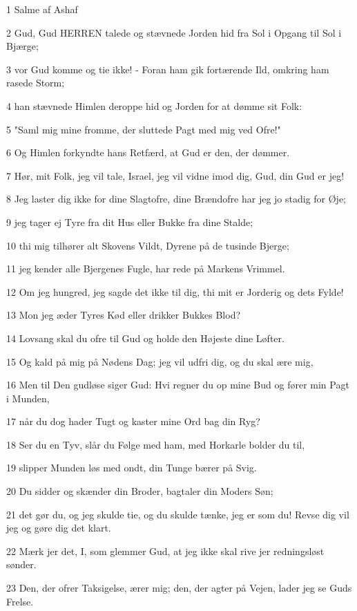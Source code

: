\par 1 Salme af Ashaf
\par 2 Gud, Gud HERREN talede og stævnede Jorden hid fra Sol i Opgang til Sol i Bjærge;
\par 3 vor Gud komme og tie ikke! - Foran ham gik fortærende Ild, omkring ham rasede Storm;
\par 4 han stævnede Himlen deroppe hid og Jorden for at dømme sit Folk:
\par 5 "Saml mig mine fromme, der sluttede Pagt med mig ved Ofre!"
\par 6 Og Himlen forkyndte hans Retfærd, at Gud er den, der dømmer.
\par 7 Hør, mit Folk, jeg vil tale, Israel, jeg vil vidne imod dig, Gud, din Gud er jeg!
\par 8 Jeg laster dig ikke for dine Slagtofre, dine Brændofre har jeg jo stadig for Øje;
\par 9 jeg tager ej Tyre fra dit Hus eller Bukke fra dine Stalde;
\par 10 thi mig tilhører alt Skovens Vildt, Dyrene på de tusinde Bjerge;
\par 11 jeg kender alle Bjergenes Fugle, har rede på Markens Vrimmel.
\par 12 Om jeg hungred, jeg sagde det ikke til dig, thi mit er Jorderig og dets Fylde!
\par 13 Mon jeg æder Tyres Kød eller drikker Bukkes Blod?
\par 14 Lovsang skal du ofre til Gud og holde den Højeste dine Løfter.
\par 15 Og kald på mig på Nødens Dag; jeg vil udfri dig, og du skal ære mig,
\par 16 Men til Den gudløse siger Gud: Hvi regner du op mine Bud og fører min Pagt i Munden,
\par 17 når du dog hader Tugt og kaster mine Ord bag din Ryg?
\par 18 Ser du en Tyv, slår du Følge med ham, med Horkarle bolder du til,
\par 19 slipper Munden løs med ondt, din Tunge bærer på Svig.
\par 20 Du sidder og skænder din Broder, bagtaler din Moders Søn;
\par 21 det gør du, og jeg skulde tie, og du skulde tænke, jeg er som du! Revse dig vil jeg og gøre dig det klart.
\par 22 Mærk jer det, I, som glemmer Gud, at jeg ikke skal rive jer redningsløst sønder.
\par 23 Den, der ofrer Taksigelse, ærer mig; den, der agter på Vejen, lader jeg se Guds Frelse.

